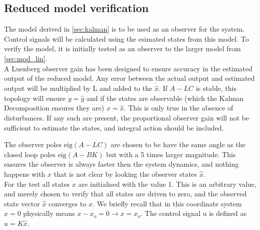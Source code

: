 \subsection{Reduced model verification}

The model derived in \cref{sec:kalman} is to be used as an observer for the system. Control signals will be calculated using the esimated states from this model. To verify the model, it is initially tested as an observer to the larger model from \cref{sec:mod_lin}.\\

A Luenberg observer gain has been designed to ensure accuracy in the estimated output of the reduced model. Any error between the actual output and estimated output will be multiplied by L and added to the $\dot{\hat{x}}$. If $A-LC$ is stable, this topology will ensure $y = \hat{y}$ and if the states are observable (which the Kalman Decomposition ensures they are) $x=\hat{x}$. This is only true in the absence of disturbances. If any such are present, the proportional observer gain will not be sufficient to estimate the states, and integral action should be included.

The observer poles $\text{eig}(A-LC)$ are chosen to be have the same angle as the closed loop poles $\text{eig}(A-BK)$ but with a 5 times larger magnitude. This ensures the observer is always faster then the system dynamics, and nothing happens with $x$ that is not clear by looking the observer states $\hat{x}$.\\

For the test all states $x$ are initialised with the value 1. This is an arbitrary value, and merely chosen to verify that all states are driven to zero, and the observed state vector $\hat{x}$ converges to $x$. We briefly recall that in this coordinate system $x=0$ physically means $x-x_o = 0 \rightarrow x=x_o$. The control signal u is defined as $u=K\hat{x}$.